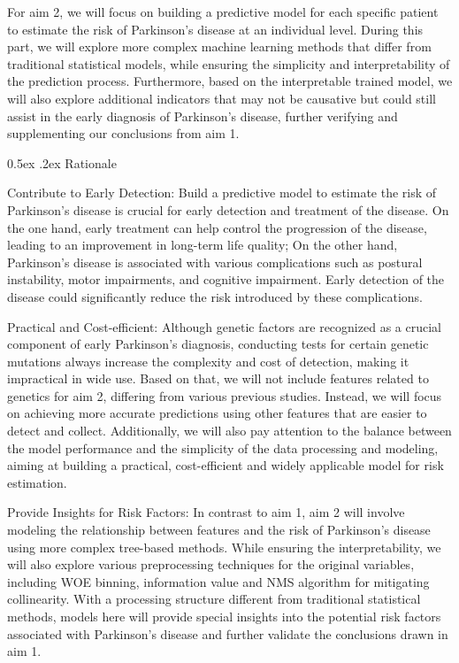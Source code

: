 \documentclass[12pt,]{article}
\makeatletter
\renewcommand\subsection{
  \@startsection{subsection}{2}{\z@}
    {-1.5ex\@plus -1ex \@minus -.2ex}%
    {0.5ex \@plus .2ex}%
    {\normalfont\normalsize\bf}} %
\makeatother
\begin{document}
For aim 2, we will focus on building a predictive model for each
specific patient to estimate the risk of Parkinson's disease at an
individual level. During this part, we will explore more complex machine
learning methods that differ from traditional statistical models, while
ensuring the simplicity and interpretability of the prediction process.
Furthermore, based on the interpretable trained model, we will also
explore additional indicators that may not be causative but could still
assist in the early diagnosis of Parkinson's disease, further verifying
and supplementing our conclusions from aim 1.

\hypertarget{rationale-2}{%
\subsection{Rationale}\label{rationale-2}}

Contribute to Early Detection: Build a predictive model to estimate the
risk of Parkinson's disease is crucial for early detection and treatment
of the disease. On the one hand, early treatment can help control the
progression of the disease, leading to an improvement in long-term life
quality; On the other hand, Parkinson's disease is associated with
various complications such as postural instability, motor impairments,
and cognitive impairment. Early detection of the disease could
significantly reduce the risk introduced by these complications.

Practical and Cost-efficient: Although genetic factors are recognized as
a crucial component of early Parkinson's diagnosis, conducting tests for
certain genetic mutations always increase the complexity and cost of
detection, making it impractical in wide use. Based on that, we will not
include features related to genetics for aim 2, differing from various
previous studies. Instead, we will focus on achieving more accurate
predictions using other features that are easier to detect and collect.
Additionally, we will also pay attention to the balance between the
model performance and the simplicity of the data processing and
modeling, aiming at building a practical, cost-efficient and widely
applicable model for risk estimation.

Provide Insights for Risk Factors: In contrast to aim 1, aim 2 will
involve modeling the relationship between features and the risk of
Parkinson's disease using more complex tree-based methods. While
ensuring the interpretability, we will also explore various
preprocessing techniques for the original variables, including WOE
binning, information value and NMS algorithm for mitigating
collinearity. With a processing structure different from traditional
statistical methods, models here will provide special insights into the
potential risk factors associated with Parkinson's disease and further
validate the conclusions drawn in aim 1.
\end{document}

